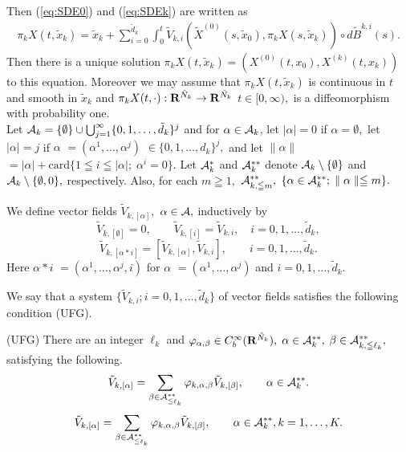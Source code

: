 \documentclass[12pt]{article}
\begin{document}
Then (\ref{eq:SDE0}) and (\ref{eq:SDEk}) are written as 
\begin{align}
\pi_k{X}(t,\tilde{x}_k) = \tilde{x}_k + \sum_{i=0}^{\tilde{d}_k} \int_{0}^{t} \tilde{V}_{k, i}(\tilde{X}^{(0)}(s,\tilde{x}_0), \pi_k{X}(s,\tilde{x}_k))\circ d\tilde{B}^{k, i}(s).
\end{align}
Then there is a unique solution $\pi_k{X}(t,\tilde{x}_k)=({X}^{(0)}(t,{x}_0), {X}^{(k)}(t,{x}_k) )$ 
to this equation. Moreover we may assume that  $\pi_k{X}(t,\tilde{x}_k)$ 
is continuous in $t$ and smooth in $\tilde{x}_k$ 
and $\pi_k{X}(t,\cdot ):{\bf R}^{\tilde{N}_k}\to {\bf R}^{\tilde{N}_k}$ $t \in [0,\infty ),$
is a diffeomorphism with probability one.
\\

Let ${\cal A}_{k} =  \{ \emptyset \} \cup 
\bigcup_{j = 1}^{\infty} \{ 0,1,\ldots , \tilde{d}_k \}^j $ 
and for $\alpha \in {\cal A}_k$, 
let $|\alpha | = 0$  if  $\alpha = \emptyset ,$ 
let $|\alpha | = j$ if 
$\alpha $ $= (\alpha^1,\ldots ,\alpha^j)$
$\in \{ 0,1,\ldots , d_k \}^j ,$ and 
let $ \parallel \alpha \parallel $ 
$ = |\alpha | + \mbox{card}\{ 1 \leqq i \leqq |\alpha | ; 
\; \alpha^i = 0 \}.$ 
Let ${\cal A}_k^{*}$ and ${\cal A}_k^{**}$ denote 
${\cal A}_k\setminus \{ \emptyset \} $ and
${\cal A}_k\setminus \{ \emptyset , 0 \},$ respectively.
Also, for each $m\geqq 1,$ ${\cal A}^{**}_{k, \leqq m},$  
$\{ \alpha \in {\cal A}^{**}_k; \; \parallel \alpha \parallel \leqq m \} .$

We define vector fields $\tilde{V}_{k,[\alpha ]},$ $\alpha \in {\cal A},$ 
inductively by
$$
\tilde{V}_{k, [\emptyset ]} = 0, 
\qquad \tilde{V}_{k, [i]} = \tilde{V}_{k,i}, 
\quad i = 0,1,\ldots ,\tilde{d}_k,
$$
$$
\tilde{V}_{k, [\alpha *i]} = [\tilde{V}_{k, [\alpha ]},\tilde{V}_{k,i}], 
\qquad i = 0,1,\ldots ,\tilde{d}_k.
$$
Here $\alpha *i$ 
$= (\alpha^1,\ldots ,\alpha^j,i)$
for $\alpha $ $= (\alpha^1,\ldots ,\alpha^j)$ and $i = 0,1,\ldots ,\tilde{d}_k.$

We say that a system $\{ \tilde{V}_{k,i} ; i=0,1,\ldots ,\tilde{d}_k \}$ of vector fields 
satisfies the following condition (UFG).

\noindent
(UFG) There are an integer $\ell_k$ 
and $\varphi_{\alpha,\beta} \in C^{\infty}_b({\bf R}^{\tilde{N}_k}),$ 
$\alpha \in {\cal A}_k^{**},$ $\beta \in {\cal A}^{**}_{k, \leqq \ell_k},$ 
satisfying the following.
$$
{\displaystyle \tilde{V}_{k,[\alpha ]} 
= \sum_{\beta \in {\cal A}^{**}_{\leqq \ell_k}}
\varphi_{k, \alpha,\beta}\tilde{V}_{k,[\beta ]}},
\qquad 
\alpha \in {\cal A}_k^{**}.
$$
$$
{\displaystyle \tilde{V}_{k,[\alpha ]} 
= \sum_{\beta \in {\cal A}^{**}_{\leqq \ell_k}}
\varphi_{k, \alpha,\beta}\tilde{V}_{k,[\beta ]}},
\qquad 
\alpha \in {\cal A}_k^{**}, k=1,\ldots,K.
$$
\end{document}
